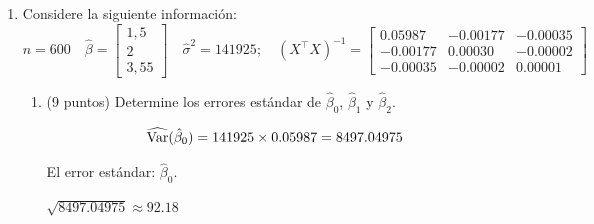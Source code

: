 \documentclass[10pt,a4paper]{article}
\begin{document}
\begin{enumerate}
\begin{enumerate}
    Utilizando información de este modelo y del modelo original que incluía las variables \textit{motheduc} y \textit{fatheduc}, realice una prueba de significancia conjunta (prueba F) para evaluar si ambas variables pueden ser excluidas del modelo sin pérdida significativa de capacidad explicativa. ¿Debe la investigación preferir el modelo completo o el modelo reducido? Justifique su elección en función de criterios estadísticos y del objetivo del análisis.

{\color{blue} Modelo no restringido: \(R^2_{ur} = 0{,}493\)

Modelo restingido: \(R^2_r = 0{,}472\)

Prueba F:

\[
F = \frac{(0{,}493 - 0{,}472)/2}{(1 - 0{,}493)/(1191 - 7)} = \frac{0{,}0105}{0{,}000428} \approx 24{,}53
\]

El valor crítico de \(F_{2, 1184}\) al 1\% es aproximadamente 4{,}60. Como \(24{,}53 > 4{,}60\), se rechaza la hipótesis nula.

Aunque las variables no son significativas individualmente, \textbf{conjuntamente sí lo son}. Por tanto, desde un punto de vista estadístico, se prefiere el \textbf{modelo completo}, ya que ofrece una mejor capacidad explicativa.
 }
\end{enumerate}
    \item Considere la siguiente información:
 \[
n=600 \quad \hat{\beta} =  \begin{bmatrix}
1,5 \\
2 \\
3,55 
\end{bmatrix} \quad \hat{\sigma}^2 = 141925; \quad 
(X^\top X)^{-1} = 
\begin{bmatrix}
0.05987 & -0.00177 & -0.00035 \\
-0.00177 & 0.00030 & -0.00002 \\
-0.00035 & -0.00002 & 0.00001
\end{bmatrix}
\]

\begin{enumerate}
    \item (9 puntos) Determine los errores estándar de $\hat{\beta}_0$, $\hat{\beta}_1$ y $\hat{\beta}_2$.
    
  {\color{blue}  
    \[
    \widehat{\text{Var}}(\hat{\beta}_0) = 141925 \times 0.05987 = 8497.04975\\ \]
    
El error estándar: $\hat{\beta}_0$.

 $\sqrt{8497.04975} \approx 92.18$

}
\end{enumerate}
\end{enumerate}
\end{document}
